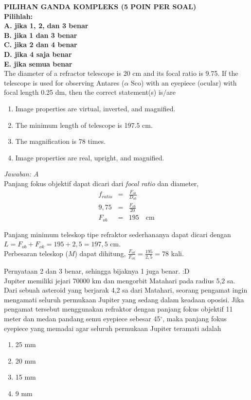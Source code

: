 \documentclass[11pt,fleqn]{exam}
\begin{document}
\begin{questions}
\vspace{0.5cm}
\textbf{PILIHAN GANDA KOMPLEKS (5 POIN PER SOAL)\\ Pilihlah:}\\
\textbf{A. jika 1, 2, dan 3 benar}\\
\textbf{B. jika 1 dan 3 benar}\\
\textbf{C. jika 2 dan 4 benar}\\
\textbf{D. jika 4 saja benar}\\
\textbf{E. jika semua benar}\\


\question The diameter of a refractor telescope is 20 cm and its focal ratio is 9.75. If the telescope is used for observing Antares ($\alpha$ Sco) with an eyepiece (ocular) with focal length 0.25 dm, then the correct statement(s) is/are
\begin{enumerate}
\item Image properties are virtual, inverted, and magnified.
\item The minimum length of telescope is 197.5 cm.
\item The magnification is 78 times.
\item Image properties are real, upright, and magnified.
\end{enumerate}

\textit{Jawaban: A}\\

Panjang fokus objektif dapat dicari dari \textit{focal ratio} dan diameter,
\begin{eqnarray*}
f_{ratio} &=& \frac{F_{ob}}{D_{ob}}\\
9,75 &=& \frac{F_{ob}}{20}\\
F_{ob} &=& 195 \quad \text{cm}
\end{eqnarray*}

Panjang minimum teleskop tipe refraktor sederhananya dapat dicari dengan $L = F_{ob} + F_{ok} = 195 + 2,5 = 197,5$ cm.\\

Perbesaran teleskop ($M$) dapat dihitung, $\frac{F_{ob}}{F_{ok}} = \frac{195}{2,5} = 78 $ kali.

Pernyataan 2 dan 3 benar, sehingga bijaknya 1 juga benar. :D\\


\question Jupiter memiliki jejari 70000 km dan mengorbit Matahari pada radius 5,2 sa. Dari sebuah asteroid yang berjarak 4,2 sa dari Matahari, seorang pengamat ingin mengamati seluruh permukaan Jupiter yang sedang dalam keadaan oposisi. Jika pengamat tersebut menggunakan refraktor dengan panjang fokus objektif 11 meter dan medan pandang semu eyepiece sebesar 45$^{\circ}$, maka panjang fokus eyepiece yang memadai agar seluruh permukaan Jupiter teramati adalah
\begin{enumerate}
\item 25 mm
\item 20 mm
\item 15 mm
\item 9 mm
\end{enumerate}


\end{questions}
\end{document}
